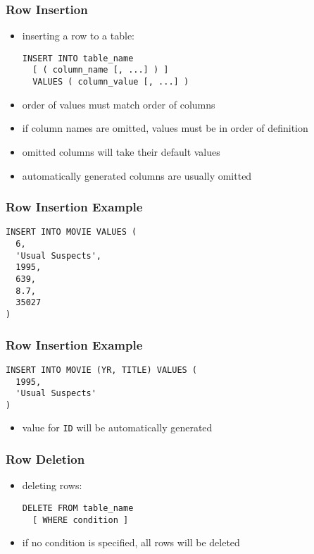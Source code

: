 \documentclass[dvipsnames]{beamer}
\theoremstyle{plain}
\begin{document}
\begin{frame}[fragile]
  \frametitle{Row Insertion}

  \begin{itemize}
    \item inserting a row to a table:
    \begin{lstlisting}
INSERT INTO table_name
  [ ( column_name [, ...] ) ]
  VALUES ( column_value [, ...] )
    \end{lstlisting}

    \pause
    \item order of values must match order of columns
    \item if column names are omitted, values must be in order of definition

    \pause
    \item omitted columns will take their default values
    \item automatically generated columns are usually omitted
  \end{itemize}
\end{frame}

\begin{frame}[fragile]
  \frametitle{Row Insertion Example}

  \begin{lstlisting}
INSERT INTO MOVIE VALUES (
  6,
  'Usual Suspects',
  1995,
  639,
  8.7,
  35027
)
  \end{lstlisting}
\end{frame}

\begin{frame}[fragile]
  \frametitle{Row Insertion Example}

  \begin{lstlisting}
INSERT INTO MOVIE (YR, TITLE) VALUES (
  1995,
  'Usual Suspects'
)
  \end{lstlisting}

  \begin{itemize}
    \item value for \texttt{ID} will be automatically generated
  \end{itemize}
\end{frame}

\begin{frame}[fragile]
  \frametitle{Row Deletion}

  \begin{itemize}
    \item deleting rows:
    \begin{lstlisting}
DELETE FROM table_name
  [ WHERE condition ]
    \end{lstlisting}

    \item if no condition is specified, all rows will be deleted
  \end{itemize}
\end{frame}
\end{document}

